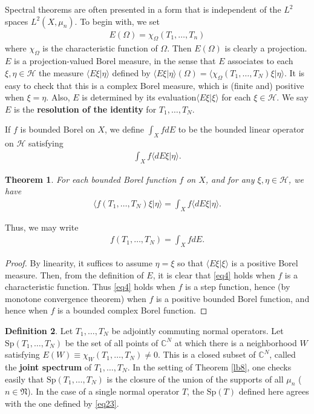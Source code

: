 \documentclass[12pt,a4paper,notitlepage]{article}
\theoremstyle{definition}
\newtheorem{df}{Definition}[section]
\theoremstyle{plain}
\newtheorem{thm}[df]{Theorem}
\newcommand{\fk}{\mathfrak}
\newcommand{\mc}{\mathcal}
\newcommand{\bk}[1]{\langle {#1}\rangle}
\newcommand{\Cbb}{\mathbb C}
\newcommand{\Sp}{\mathrm{Sp}}
\numberwithin{equation}{section}
\begin{document}
Spectral theorems are often presented in a form that is independent of the $L^2$ spaces $L^2(X,\mu_n)$. To begin with, we set
\begin{align}
E(\Omega)=\chi_\Omega(T_1,\dots,T_n)
\end{align}
where $\chi_\Omega$  is the characteristic function of $\Omega$. Then $E(\Omega)$ is clearly a projection. $E$ is a projection-valued Borel measure, in the sense that $E$ associates to each $\xi,\eta\in\mc H$ the measure $\bk{E\xi|\eta}$ defined by $\bk{E\xi|\eta}(\Omega)=\bk{\chi_\Omega(T_1,\dots,T_N)\xi|\eta}$. It is easy to check that this is a complex Borel measure, which is (finite and) positive when $\xi=\eta$. Also, $E$ is determined by its evaluation$\bk{E\xi|\xi}$ for each $\xi\in\mc H$. We say $E$ is the \textbf{resolution of the identity} for $T_1,\dots,T_N$.

If $f$ is bounded Borel on $X$, we define $\int_XfdE$ to be the bounded linear operator on $\mc H$ satisfying
\begin{align*}
\int_X f\bk{dE\xi|\eta}.	
\end{align*}

\begin{thm}\label{lb49}
For each bounded Borel function $f$ on $X$, and for any $\xi,\eta\in\mc H$, we have
\begin{align}\label{eq4}
\bk{f(T_1,\dots,T_N)\xi|\eta}=\int_Xf\bk{dE\xi|\eta}.	
\end{align}
\end{thm}

Thus, we may write 
\begin{align}
f(T_1,\dots,T_N)=\int_X fdE.
\end{align}

\begin{proof}
By linearity, it suffices to assume $\eta=\xi$ so that $\bk{E\xi|\xi}$ is a positive Borel measure. Then, from the definition of $E$, it is clear that \eqref{eq4} holds when $f$ is a characteristic function.  Thus \eqref{eq4} holds when $f$ is a step function, hence (by monotone convergence theorem) when $f$ is a positive bounded Borel function, and hence when $f$ is a bounded complex Borel function. 
\end{proof}


\begin{df}
Let $T_1,\dots,T_N$ be adjointly commuting normal operators. Let $\Sp(T_1,\dots,T_N)$ be the set of all points of $\Cbb^N$ at which there is a neighborhood $W$ satisfying $E(W)\equiv \chi_W(T_1,\dots,T_N)\neq0$. \index{Sp@$\Sp(T_1,\dots,T_N)$} This is a closed subset of $\Cbb^N$, called the \textbf{joint spectrum} of $T_1,\dots,T_N$. In the setting of Theorem \ref{lb8}, one checks easily that $\Sp(T_1,\dots,T_N)$ is the closure of the union of the supports of all $\mu_n$ ($n\in\fk N$). In the case of a single normal operator $T$, the $\Sp(T)$ defined here agrees with the one defined by \eqref{eq23}.
\end{df}
\end{document}
